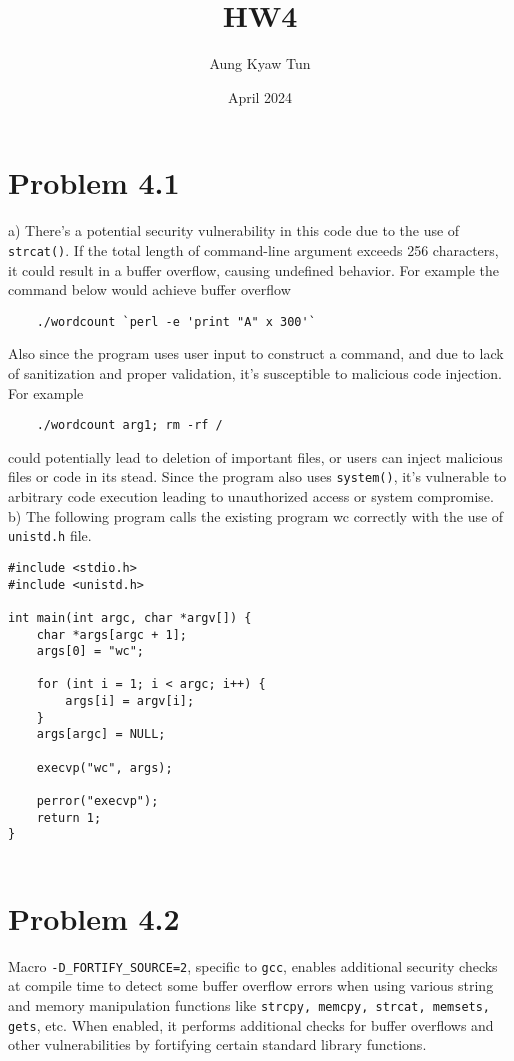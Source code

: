 \documentclass{article}
\title{HW4}
\author{Aung Kyaw Tun }
\date{April 2024}
\begin{document}
\maketitle

\section{Problem 4.1}

a)  There's a potential security vulnerability in this code due to the use of \texttt{strcat()}. If the total length of command-line argument exceeds 256 characters, it could result in a buffer overflow, causing undefined behavior. For example the command below would achieve buffer overflow

\begin{verbatim}
    ./wordcount `perl -e 'print "A" x 300'`
\end{verbatim}
Also since the program uses user input to construct a command, and due to lack of sanitization and proper validation, it's susceptible to malicious code injection. For example

\begin{verbatim}
    ./wordcount arg1; rm -rf /
\end{verbatim}
could potentially lead to deletion of important files, or users can inject malicious files or code in its stead. 
Since the program also uses \texttt{system()}, it's vulnerable to arbitrary code execution leading to unauthorized access or system compromise. \\

b) The following program calls the existing program wc correctly with the use of \texttt{unistd.h} file.
\begin{verbatim}
#include <stdio.h>
#include <unistd.h>

int main(int argc, char *argv[]) {
    char *args[argc + 1];
    args[0] = "wc";  

    for (int i = 1; i < argc; i++) {
        args[i] = argv[i];
    }
    args[argc] = NULL;  

    execvp("wc", args);

    perror("execvp");
    return 1;
}


\end{verbatim}

\section{Problem 4.2}

Macro \texttt{-D\_FORTIFY\_SOURCE=2}, specific to \texttt{gcc}, enables additional security checks at compile time to detect some buffer overflow errors when using various string and memory manipulation functions like \texttt{strcpy, memcpy, strcat, memsets, gets}, etc. When enabled, it performs additional checks for buffer overflows and other vulnerabilities by fortifying certain standard library functions.\\ 
\end{document}
